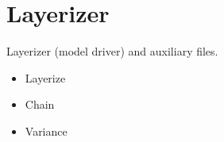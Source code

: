 % 
% 
\chapter{Layerizer}

Layerizer (model driver) and auxiliary files.

\begin{iftex}
\begin{itemize}
\item Layerize
\item Chain
\item Variance
\end{itemize}
\end{iftex}





